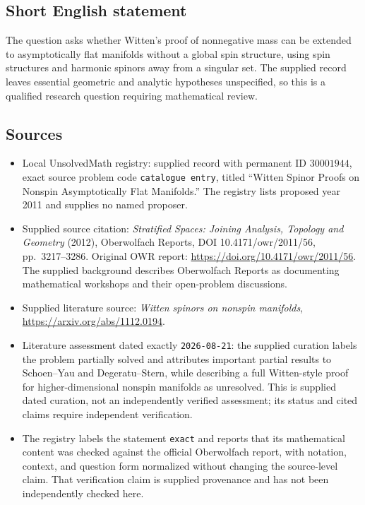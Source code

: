 \documentclass[11pt]{article}
\begin{document}
\subsection{Short English statement}
The question asks whether Witten's proof of nonnegative mass can be extended to asymptotically flat manifolds without a global spin structure, using spin structures and harmonic spinors away from a singular set. The supplied record leaves essential geometric and analytic hypotheses unspecified, so this is a qualified research question requiring mathematical review.
\subsection{Sources}
\begin{itemize}
\item Local UnsolvedMath registry: supplied record with permanent ID \(30001944\), exact source problem code \texttt{catalogue entry}, titled ``Witten Spinor Proofs on Nonspin Asymptotically Flat Manifolds.'' The registry lists proposed year 2011 and supplies no named proposer.
\item Supplied source citation: \emph{Stratified Spaces: Joining Analysis, Topology and Geometry} (2012), Oberwolfach Reports, DOI 10.4171/owr/2011/56, pp.\ 3217--3286. Original OWR report: \url{https://doi.org/10.4171/owr/2011/56}. The supplied background describes Oberwolfach Reports as documenting mathematical workshops and their open-problem discussions.
\item Supplied literature source: \emph{Witten spinors on nonspin manifolds}, \url{https://arxiv.org/abs/1112.0194}.
\item Literature assessment dated exactly \texttt{2026-08-21}: the supplied curation labels the problem partially solved and attributes important partial results to Schoen--Yau and Degeratu--Stern, while describing a full Witten-style proof for higher-dimensional nonspin manifolds as unresolved. This is supplied dated curation, not an independently verified assessment; its status and cited claims require independent verification.
\item The registry labels the statement \texttt{exact} and reports that its mathematical content was checked against the official Oberwolfach report, with notation, context, and question form normalized without changing the source-level claim. That verification claim is supplied provenance and has not been independently checked here.
\end{itemize}
\end{document}
